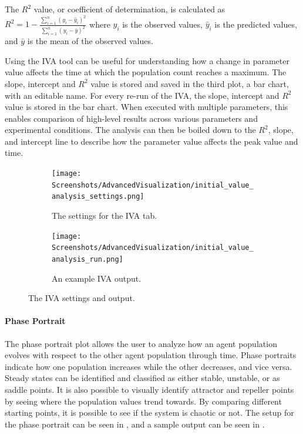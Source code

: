 The $R^2$ value, or coefficient of determination, is calculated as $R^2 = 1 - \frac{\sum_{i=1}^n (y_i - \hat{y}_i)^2}{\sum_{i=1}^n (y_i - \bar{y})^2}$
where $y_i$ is the observed values, $\hat{y}_i$ is the predicted values, and $\bar{y}$ is the mean of the observed values.

Using the IVA tool can be useful for understanding how a change in parameter value affects the time at which the population count reaches a maximum.
The slope, intercept and $R^2$ value is stored and saved in the third plot, a bar chart, with an editable name. 
For every re-run of the IVA, the slope, intercept and $R^2$ value is stored in the bar chart. 
When executed with multiple parameters, this enables comparison of high-level results across various parameters and experimental conditions.
The analysis can then be boiled down to the $R^2$, slope, and intercept line to describe how the parameter value affects the peak value and time. 

\begin{figure}[h!]
    \centering
    \begin{subfigure}{0.49\linewidth}
        \centering
        \captionsetup{width=1\linewidth}
        \texttt{[image: Screenshots/AdvancedVisualization/initial\_value\_analysis\_settings.png]}
        \caption{
            The settings for the IVA tab. 
        }
        \label{fig:ss:av:initial_value_analysis_settings}
        \vspace*{\fill}
    \end{subfigure}
    \hfill
    \begin{subfigure}{0.49\linewidth}
        \centering
        \captionsetup{width=1\linewidth}
        \texttt{[image: Screenshots/AdvancedVisualization/initial\_value\_analysis\_run.png]}
        \caption{
            An example IVA output. 
        }
        \label{fig:ss:av:initial_value_analysis_run}
        \vspace*{\fill}
    \end{subfigure}
    \caption{The IVA settings and output. }
\end{figure}

\paragraph{Phase Portrait}
\label{sec:phase_portrait}
The phase portrait plot allows the user to analyze how an agent population evolves with respect to the other agent population through time.
Phase portraits indicate how one population increases while the other decreases, and vice versa.
Steady states can be identified and classified as either stable, unstable, or as saddle points. 
It is also possible to visually identify attractor and repeller points by seeing where the population values trend towards. 
By comparing different starting points, it is possible to see if the system is chaotic or not.
The setup for the phase portrait can be seen in , and a sample output can be seen in . 

